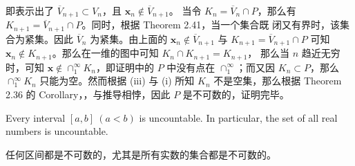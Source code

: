 \documentclass[../poma-notes.tex]{subfiles}
\begin{document}
\begin{anote}
\begin{itemize}
\begin{center}
          \end{center}
          即表示出了 $\overline{V}_{n+1} \subset V_n$，且 $\mathbf{x}_n \notin \overline{V}_{n+1}$。
          当令 $K_n = \overline{V}_n \cap P$，那么有 $K_{n+1} = \overline{V}_{n+1} \cap P$。同时，根据 Theorem 2.41，当一个集合既
          闭又有界时，该集合为紧集。因此 $\overline{V}_n$ 为紧集。由上面的 $\mathbf{x}_n \notin \overline{V}_{n+1}$ 与
          $K_{n+1} = \overline{V}_{n+1} \cap P$ 可知 $\mathbf{x}_n \notin K_{n+1}$。那么在一维的图中可知 $K_n\cap K_{n+1}=K_{n+1}$，
          那么当 $n$ 趋近无穷时，可知 $\mathbf{x} \notin \cap_1^{\infty} K_n$，即证明中的 $P$ 中没有点在 $\cap_1^{\infty}$；而又因
          $K_n \subset P$，那么 $\cap_1^{\infty} K_n$ 只能为空。然而根据 (iii) 与 (i) 所知 $K_n$ 不是空集，那么根据 Theorem 2.36 的
          Corollary，，与推导相悖，因此 $P$ 是不可数的，证明完毕。
  \end{itemize}
\end{anote}

\begin{corollary}
  Every interval $[a,b]\ (a<b)$ is uncountable. In particular, the set of all real numbers is uncountable.
\end{corollary}

\anote 任何区间都是不可数的，尤其是所有实数的集合都是不可数的。
\end{document}
